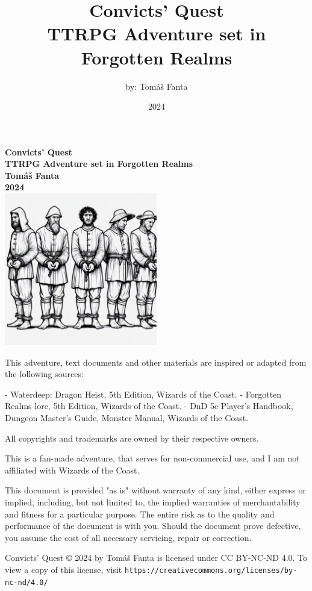\documentclass[10pt,onecolumn,twoside,openany,bg=full,layout=true]{dndbook}
\begin{document}
\frontmatter
\title {Convicts' Quest\\ \large TTRPG Adventure set in Forgotten Realms}
\author {by: Tomáš Fanta}
\date {2024}



\begin{titlepage}
    \centering
    \textbf {\huge Convicts' Quest\\\large TTRPG Adventure set in Forgotten Realms\\}
    \textbf {Tomáš Fanta\\}
    \textbf {2024\\}
    \vspace{1.5cm}
    \includegraphics[width=0.5\textwidth]{img/title}\\[1cm]
    \vfill
    \begin{flushleft}
      \footnotesize
      This adventure, text documents and other materials are inspired or adapted from the following sources:

      - Waterdeep: Dragon Heist, 5th Edition, Wizards of the Coast.
      - Forgotten Realms lore, 5th Edition, Wizards of the Coast.
      - DnD 5e Player's Handbook, Dungeon Master's Guide, Monster Manual, Wizards of the Coast.

      All copyrights and trademarks are owned by their respective owners.

      This is a fan-made adventure, that serves for non-commercial use, and I am not affiliated with Wizards of the Coast.

      This document is provided "as is" without warranty of any kind, either express or implied, including, but not limited to,
      the implied warranties of merchantability and fitness for a particular purpose.
      The entire risk as to the quality and performance of the document is with you.
      Should the document prove defective, you assume the cost of all necessary servicing, repair or correction.

      Convicts' Quest © 2024 by Tomáš Fanta is licensed under CC BY-NC-ND 4.0. To view a copy of this license, visit \texttt{https://creativecommons.org/licenses/by-nc-nd/4.0/}
    \end{flushleft}
\end{titlepage}
\end{document}
